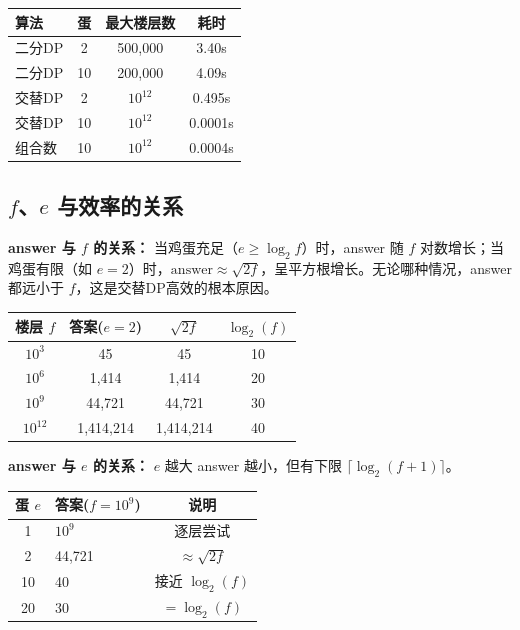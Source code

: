 \documentclass[12pt,a4paper]{article}
\begin{document}
\begin{table}[H]
\centering
\begin{tabular}{@{}lccc@{}}
\toprule
\textbf{算法} & \textbf{蛋} & \textbf{最大楼层数} & \textbf{耗时} \\
\midrule
二分DP & 2 & 500,000 & 3.40s \\
二分DP & 10 & 200,000 & 4.09s \\
交替DP & 2 & $10^{12}$ & 0.495s \\
交替DP & 10 & $10^{12}$ & 0.0001s \\
组合数 & 10 & $10^{12}$ & 0.0004s \\
\bottomrule
\end{tabular}
\end{table}

\subsection{$f$、$e$ 与效率的关系}

\textbf{answer 与 $f$ 的关系：} 当鸡蛋充足（$e \geq \log_2 f$）时，answer 随 $f$ 对数增长；当鸡蛋有限（如 $e=2$）时，$\text{answer} \approx \sqrt{2f}$，呈平方根增长。无论哪种情况，answer 都远小于 $f$，这是交替DP高效的根本原因。

\begin{table}[H]
\centering
\begin{tabular}{@{}cccc@{}}
\toprule
\textbf{楼层 $f$} & \textbf{答案($e=2$)} & \boldmath$\sqrt{2f}$ & \boldmath$\log_2(f)$ \\
\midrule
$10^3$ & 45 & 45 & 10 \\
$10^6$ & 1,414 & 1,414 & 20 \\
$10^9$ & 44,721 & 44,721 & 30 \\
$10^{12}$ & 1,414,214 & 1,414,214 & 40 \\
\bottomrule
\end{tabular}
\end{table}

\textbf{answer 与 $e$ 的关系：} $e$ 越大 answer 越小，但有下限 $\lceil \log_2(f+1) \rceil$。

\begin{table}[H]
\centering
\begin{tabular}{@{}clc@{}}
\toprule
\textbf{蛋 $e$} & \textbf{答案($f=10^9$)} & \textbf{说明} \\
\midrule
1 & $10^9$ & 逐层尝试 \\
2 & 44,721 & $\approx \sqrt{2f}$ \\
10 & 40 & 接近 $\log_2(f)$ \\
20 & 30 & $= \log_2(f)$ \\
\bottomrule
\end{tabular}
\end{table}
\end{document}
